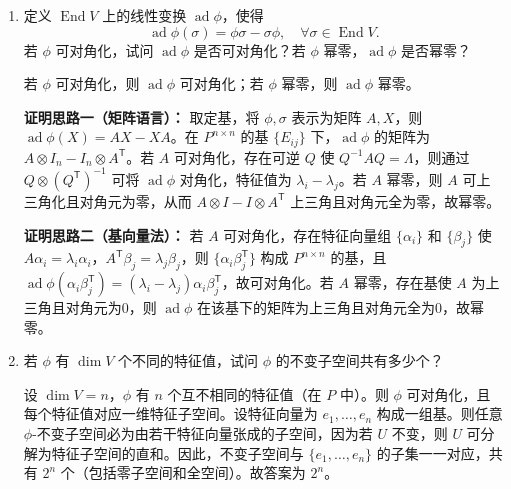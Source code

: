 \documentclass[lang=cn,12pt]{elegantbook}
\begin{document}
\begin{example}
\begin{enumerate}
        \item[(3)] 定义 \(\operatorname{End}V\) 上的线性变换 \(\operatorname{ad}\phi\)，使得
            \[
            \operatorname{ad}\phi(\sigma) = \phi\sigma - \sigma\phi,\quad \forall \sigma\in \operatorname{End}V.
            \]
            若 \(\phi\) 可对角化，试问 \(\operatorname{ad}\phi\) 是否可对角化？若 \(\phi\) 幂零，\(\operatorname{ad}\phi\) 是否幂零？
    
        \begin{solution}
            若 \(\phi\) 可对角化，则 \(\operatorname{ad}\phi\) 可对角化；若 \(\phi\) 幂零，则 \(\operatorname{ad}\phi\) 幂零。
    
            \textbf{证明思路一（矩阵语言）：} 取定基，将 \(\phi,\sigma\) 表示为矩阵 \(A,X\)，则 \(\operatorname{ad}\phi(X)=AX-XA\)。在 \(P^{n\times n}\) 的基 \(\{E_{ij}\}\) 下，\(\operatorname{ad}\phi\) 的矩阵为 \(A\otimes I_n - I_n\otimes A^{\mathsf{T}}\)。若 \(A\) 可对角化，存在可逆 \(Q\) 使 \(Q^{-1}AQ=\Lambda\)，则通过 \(Q\otimes (Q^{\mathsf{T}})^{-1}\) 可将 \(\operatorname{ad}\phi\) 对角化，特征值为 \(\lambda_i-\lambda_j\)。若 \(A\) 幂零，则 \(A\) 可上三角化且对角元为零，从而 \(A\otimes I - I\otimes A^{\mathsf{T}}\) 上三角且对角元全为零，故幂零。
    
            \textbf{证明思路二（基向量法）：} 若 \(A\) 可对角化，存在特征向量组 \(\{\alpha_i\}\) 和 \(\{\beta_j\}\) 使 \(A\alpha_i=\lambda_i\alpha_i\)，\(A^{\mathsf{T}}\beta_j=\lambda_j\beta_j\)，则 \(\{\alpha_i\beta_j^{\mathsf{T}}\}\) 构成 \(P^{n\times n}\) 的基，且 \(\operatorname{ad}\phi(\alpha_i\beta_j^{\mathsf{T}})=(\lambda_i-\lambda_j)\alpha_i\beta_j^{\mathsf{T}}\)，故可对角化。若 \(A\) 幂零，存在基使 \(A\) 为上三角且对角元为0，则 \(\operatorname{ad}\phi\) 在该基下的矩阵为上三角且对角元全为0，故幂零。
        \end{solution}
    
        \item[(4)] 若 \(\phi\) 有 \(\dim V\) 个不同的特征值，试问 \(\phi\) 的不变子空间共有多少个？
    
        \begin{solution}
            设 \(\dim V=n\)，\(\phi\) 有 \(n\) 个互不相同的特征值（在 \(P\) 中）。则 \(\phi\) 可对角化，且每个特征值对应一维特征子空间。设特征向量为 \(e_1,\dots,e_n\) 构成一组基。则任意 \(\phi\)-不变子空间必为由若干特征向量张成的子空间，因为若 \(U\) 不变，则 \(U\) 可分解为特征子空间的直和。因此，不变子空间与 \(\{e_1,\dots,e_n\}\) 的子集一一对应，共有 \(2^n\) 个（包括零子空间和全空间）。故答案为 \(2^n\)。
        \end{solution}
    \end{enumerate}
\end{example}
\end{document}

